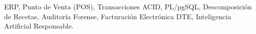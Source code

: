\documentclass[conference]{IEEEtran}
\begin{document}
\begin{IEEEkeywords}
ERP, Punto de Venta (POS), Transacciones ACID, PL/pgSQL, Descomposición de Recetas, Auditoría Forense, Facturación Electrónica DTE, Inteligencia Artificial Responsable.
\end{IEEEkeywords}











\end{document}
